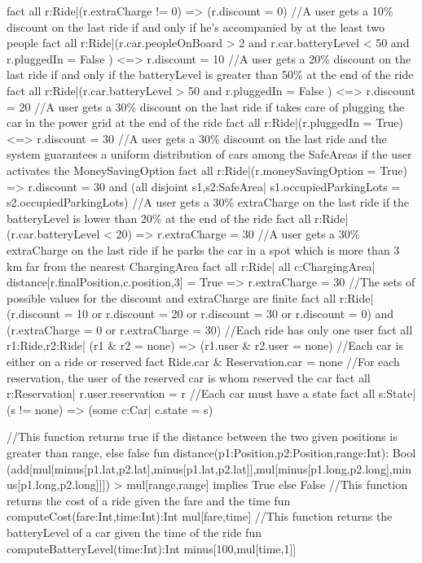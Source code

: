 \documentclass[11pt,a4paper]{report}
\begin{document}
\begin{alloyCode}
fact{
	all r:Ride|(r.extraCharge != 0) => (r.discount = 0)
}
//A user gets a 10\% discount on the last ride if and only if he's accompanied by at the least two people
fact{
	all r:Ride|(r.car.peopleOnBoard > 2 and r.car.batteryLevel < 50 and r.pluggedIn = False ) <=> r.discount = 10
}
//A user gets a 20\% discount on the last ride if and only if the batteryLevel is greater than 50\% at the end of the ride
fact{
	all r:Ride|(r.car.batteryLevel > 50 and r.pluggedIn = False ) <=> r.discount = 20
}
//A user gets a 30\% discount on the last ride if takes care of plugging the car in the power grid at the end of the ride
fact{
	all r:Ride|(r.pluggedIn = True) <=> r.discount = 30
}
//A user gets a 30\% discount on the last ride and the system guarantees a uniform distribution of cars among the SafeAreas if the user activates the MoneySavingOption
fact{
	all r:Ride|(r.moneySavingOption = True) => r.discount = 30 and (all disjoint s1,s2:SafeArea| s1.occupiedParkingLots = s2.occupiedParkingLots)
}
//A user gets a 30\% extraCharge on the last ride if the batteryLevel is lower than 20\% at the end of the ride
fact{
	all r:Ride|(r.car.batteryLevel < 20) => r.extraCharge = 30
}
//A user gets a 30\% extraCharge on the last ride if he parks the car in a spot which is more than 3 km far from the nearest ChargingArea
fact{
	all r:Ride| all c:ChargingArea| distance[r.finalPosition,c.position,3] = True => r.extraCharge = 30
}
//The sets of possible values for the discount and extraCharge are finite
fact{
	all r:Ride|(r.discount = 10 or r.discount = 20 or r.discount = 30 or r.discount = 0) and (r.extraCharge = 0 or r.extraCharge = 30)
}
//Each ride has only one user
fact{
	all r1:Ride,r2:Ride| (r1 & r2 = none) => (r1.user & r2.user = none)
}
//Each car is either on a ride or reserved
fact{
	Ride.car & Reservation.car = none
}
//For each reservation, the user of the reserved car is whom reserved the car
fact{
	all r:Reservation| r.user.reservation = r 
}
//Each car must have a state
fact{
	all s:State| (s != none) => (some c:Car| c.state = s)
}


//This function returns true if the distance between the two given positions is greater than range, else false
fun distance(p1:Position,p2:Position,range:Int): Bool{
	(add[mul[minus[p1.lat,p2.lat],minus[p1.lat,p2.lat]],mul[minus[p1.long,p2.long],minus[p1.long,p2.long]]]) > mul[range,range] implies True else False
}
//This function returns the cost of a ride given the fare and the time
fun computeCost(fare:Int,time:Int):Int{
	mul[fare,time]
}
//This function returns the batteryLevel of a car given the time of the ride
fun computeBatteryLevel(time:Int):Int{
	minus[100,mul[time,1]]
}



\end{alloyCode}
\end{document}

